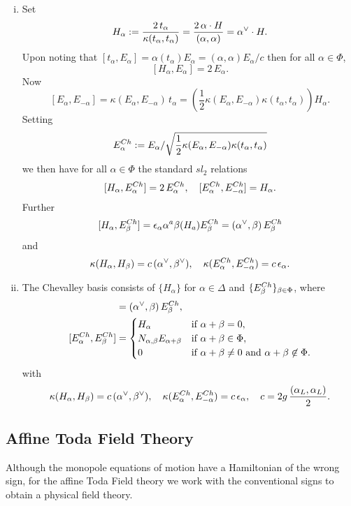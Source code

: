 \documentclass{article}
\begin{document}
\begin{enumerate}[(i)]
	\item Set
	$$H_\alpha:=\frac{2\,t_\alpha}{\kappa(t_\alpha,t_\alpha)}=\frac{2\,\alpha\cdot H}{(\alpha,\alpha)}
	=\alpha\sp\vee\cdot H.
	$$
	Upon noting that $[t_\alpha, E_\alpha]=\alpha(t_\alpha)E_\alpha=(\alpha,\alpha)E_\alpha/{c}$
	then for all $\alpha\in\Phi$,
	$$[H_\alpha, E_\alpha]=2\,E_\alpha.
	$$
	Now
	$$ [E_\alpha,E_{-\alpha}]=\kappa(E_\alpha,E_{-\alpha})\,t_\alpha=
	\left(\frac12 \kappa(E_\alpha,E_{-\alpha}) \kappa(t_\alpha,t_\alpha) \right) H_\alpha.
	$$
	Setting
	$$E_\alpha\sp{Ch}:=E_\alpha/\sqrt{\frac12 \kappa(E_\alpha,E_{-\alpha}) \kappa(t_\alpha,t_\alpha) }$$
	we then have for  all $\alpha\in\Phi$ the standard $sl_2$ relations
	$$[H_\alpha, E_\alpha\sp{Ch}]=2\,E_\alpha\sp{Ch},\quad [E_\alpha\sp{Ch},E_{-\alpha}\sp{Ch}]=H_\alpha.
	$$
	Further
	$$[H_\alpha, E_\beta\sp{Ch}]=\epsilon_\alpha \alpha\sp{a} \beta(H_a) E_\beta\sp{Ch}=
	(\alpha\sp\vee,\beta)\, E_\beta\sp{Ch}
	$$
	and
	$$\kappa(H_\alpha,H_\beta)=c\,(\alpha\sp\vee,\beta\sp\vee),\quad
	\kappa(E_\alpha\sp{Ch},E_{-\alpha}\sp{Ch})=c\,\epsilon_\alpha.
	$$
	
	
	\item The Chevalley basis consists of
	$\{H_\alpha\}$ for $\alpha\in\Delta$ and $\{E_\beta\sp{Ch}\}_{\beta\in\Phi}$, 
	where
	\begin{align*} 
	[H_\alpha, E_\beta\sp{Ch}]&=(\alpha\sp\vee,\beta)\, E_\beta\sp{Ch},\\
	[E_\alpha\sp{Ch},E_\beta\sp{Ch}]&=
	\begin{cases} H_\alpha
	&\text{if }\alpha+\beta=0,\\
	N_{\alpha,\beta}E_{\alpha+\beta}&\text{if }\alpha+\beta\in\Phi,\\
	0&\text{if }\alpha+\beta\ne0\text{ and }\alpha+\beta\not\in\Phi.
	\end{cases}
	\end{align*}
	with
	$$\kappa(H_\alpha,H_\beta)=c\,(\alpha\sp\vee,\beta\sp\vee),\quad
	\kappa(E_\alpha\sp{Ch},E_{-\alpha}\sp{Ch})=c\,\epsilon_\alpha, \quad
	c=2g\, \frac{(\alpha_L,\alpha_L)}{2}.
	$$
	
	
	
	
\end{enumerate}




\subsection{Affine Toda Field Theory}
Although the monopole equations of motion have a Hamiltonian of the wrong sign, for the affine Toda Field theory we work with the conventional signs to obtain a physical field theory.
\end{document}
